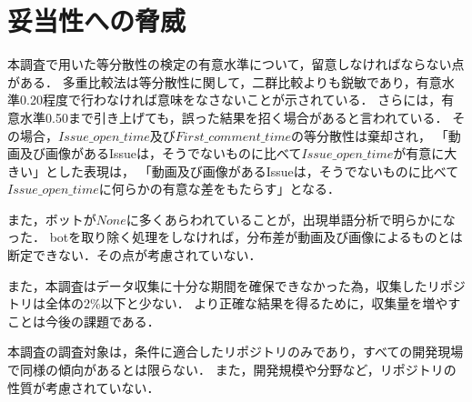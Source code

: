 \section{妥当性への脅威\label{threats}}


本調査で用いた等分散性の検定の有意水準について，留意しなければならない点がある．
多重比較法は等分散性に関して，二群比較よりも鋭敏であり，有意水準0.20程度で行わなければ意味をなさないことが示されている．\cite{Test_Level}
さらには，有意水準0.50まで引き上げても，誤った結果を招く場合があると言われている．
その場合，$Issue\_open\_time$及び$First\_comment\_time$の等分散性は棄却され，
「動画及び画像があるIssueは，そうでないものに比べて$Issue\_open\_time$が有意に大きい」とした表現は，
「動画及び画像があるIssueは，そうでないものに比べて$Issue\_open\_time$に何らかの有意な差をもたらす」となる．

また，ボットが$None$に多くあらわれていることが，出現単語分析で明らかになった．
botを取り除く処理をしなければ，分布差が動画及び画像によるものとは断定できない．その点が考慮されていない．


また，本調査はデータ収集に十分な期間を確保できなかった為，収集したリポジトリは全体の2\%以下と少ない．
より正確な結果を得るために，収集量を増やすことは今後の課題である．

本調査の調査対象は，条件に適合したリポジトリのみであり，すべての開発現場で同様の傾向があるとは限らない．
また，開発規模や分野など，リポジトリの性質が考慮されていない．
